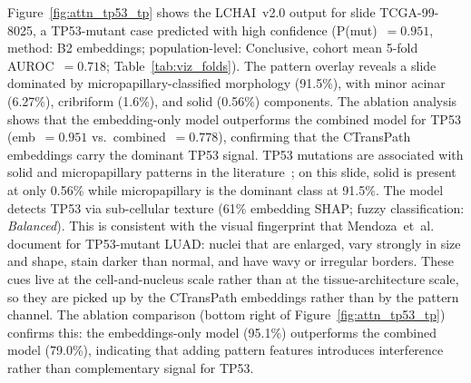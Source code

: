 Figure~\ref{fig:attn_tp53_tp} shows the LCHAI~v2.0 output for slide
TCGA-99-8025, a TP53-mutant case predicted with high confidence
(P(mut)~$= 0.951$, method: B2 embeddings; population-level: Conclusive,
cohort mean 5-fold AUROC~$= 0.718$; Table~\ref{tab:viz_folds}).
The pattern overlay reveals a slide dominated by micropapillary-classified morphology
(91.5\%), with minor acinar (6.27\%), cribriform (1.6\%), and solid
(0.56\%) components.
The ablation analysis shows that the embedding-only model outperforms
the combined model for TP53 (emb~$= 0.951$ vs.\ combined~$= 0.778$),
confirming that the CTransPath embeddings carry the dominant TP53
signal.
TP53 mutations are associated with solid and micropapillary
patterns in the literature~\cite{ahn2022tp53highgrade}; on this slide, solid is present at only 0.56\%
while micropapillary is the dominant class at 91.5\%.
The model detects TP53 via sub-cellular texture (61\% embedding SHAP;
fuzzy classification: \emph{Balanced}). This is consistent with the
visual fingerprint that Mendoza~et~al.~\cite{mendoza2024tp53nuclear}
document for TP53-mutant LUAD: nuclei that are enlarged, vary
strongly in size and shape, stain darker than normal, and have wavy
or irregular borders. These cues live at the cell-and-nucleus scale
rather than at the tissue-architecture scale, so they are picked up
by the CTransPath embeddings rather than by the pattern channel.
The ablation comparison (bottom right of Figure~\ref{fig:attn_tp53_tp})
confirms this: the embeddings-only model (95.1\%) outperforms the combined
model (79.0\%), indicating that adding pattern features introduces
interference rather than complementary signal for TP53.

